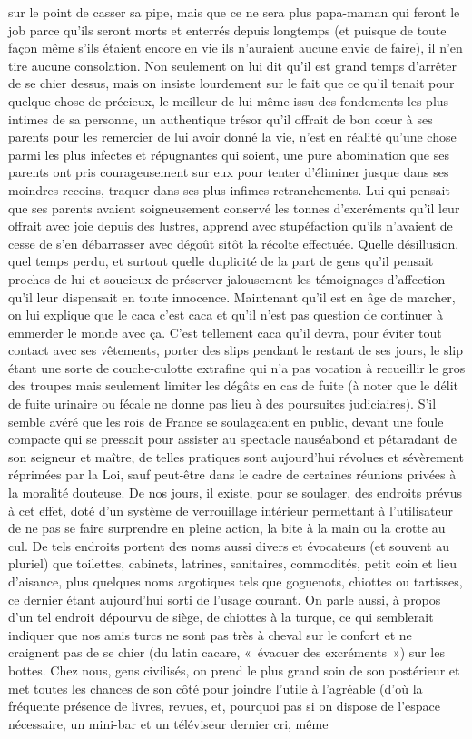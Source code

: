 sur le point de casser sa pipe, mais que ce ne sera plus papa-maman qui feront le job parce qu’ils seront morts et enterrés depuis longtemps (et puisque de toute façon même s’ils étaient encore en vie ils n’auraient aucune envie de faire), il n’en tire aucune consolation. Non seulement on lui dit qu’il est grand temps d’arrêter de se chier dessus, mais on insiste lourdement sur le fait que ce qu’il tenait pour quelque chose de précieux, le meilleur de lui-même issu des fondements les plus intimes de sa personne, un authentique trésor qu’il offrait de bon cœur à ses parents pour les remercier de lui avoir donné la vie, n’est en réalité qu’une chose parmi les plus infectes et répugnantes qui soient, une pure abomination que ses parents ont pris courageusement sur eux pour tenter d’éliminer jusque dans ses moindres recoins, traquer dans ses plus infimes retranchements. Lui qui pensait que ses parents avaient soigneusement conservé les tonnes d’excréments qu’il leur offrait avec joie depuis des lustres, apprend avec stupéfaction qu’ils n’avaient de cesse de s’en débarrasser avec dégoût sitôt la récolte effectuée. Quelle désillusion, quel temps perdu, et surtout quelle duplicité de la part de gens qu’il pensait proches de lui et soucieux de préserver jalousement les témoignages d’affection qu’il leur dispensait en toute innocence. Maintenant qu’il est en âge de marcher, on lui explique que le caca c’est caca et qu’il n’est pas question de continuer à emmerder le monde avec ça. C’est tellement caca qu’il devra, pour éviter tout contact avec ses vêtements, porter des slips pendant le restant de ses jours, le slip étant une sorte de couche-culotte extrafine qui n’a pas vocation à recueillir le gros des troupes mais seulement limiter les dégâts en cas de fuite (à noter que le délit de fuite urinaire ou fécale ne donne pas lieu à des poursuites judiciaires). S’il semble avéré que les rois de France se soulageaient en public, devant une foule compacte qui se pressait pour assister au spectacle nauséabond et pétaradant de son seigneur et maître, de telles pratiques sont aujourd’hui révolues et sévèrement réprimées par la Loi, sauf peut-être dans le cadre de certaines réunions privées à la moralité douteuse. De nos jours, il existe, pour se soulager, des endroits prévus à cet effet, doté d’un système de verrouillage intérieur permettant à l’utilisateur de ne pas se faire surprendre en pleine action, la bite à la main ou la crotte au cul. De tels endroits portent des noms aussi divers et évocateurs (et souvent au pluriel) que toilettes, cabinets, latrines, sanitaires, commodités, petit coin et lieu d’aisance, plus quelques noms argotiques tels que goguenots, chiottes ou tartisses, ce dernier étant aujourd’hui sorti de l’usage courant. On parle aussi, à propos d’un tel endroit dépourvu de siège, de chiottes à la turque, ce qui semblerait indiquer que nos amis turcs ne sont pas très à cheval sur le confort et ne craignent pas de se chier (du latin cacare, «~évacuer des excréments~») sur les bottes. Chez nous, gens civilisés, on prend le plus grand soin de son postérieur et met toutes les chances de son côté pour joindre l’utile à l’agréable (d’où la fréquente présence de livres, revues, et, pourquoi pas si on dispose de l’espace nécessaire, un mini-bar et un téléviseur dernier cri, même 